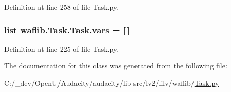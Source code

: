 Definition at line 258 of file Task.\+py.

\subsubsection[{\texorpdfstring{vars}{vars}}]{\setlength{\rightskip}{0pt plus 5cm}list waflib.\+Task.\+Task.\+vars = \mbox{[}$\,$\mbox{]}\hspace{0.3cm}{\ttfamily [static]}}\hypertarget{classwaflib_1_1_task_1_1_task_a3935d632055836871b233ce2deb9f008}{}\label{classwaflib_1_1_task_1_1_task_a3935d632055836871b233ce2deb9f008}


Definition at line 225 of file Task.\+py.



The documentation for this class was generated from the following file\+:\begin{DoxyCompactItemize}
\item 
C\+:/\+\_\+dev/\+Open\+U/\+Audacity/audacity/lib-\/src/lv2/lilv/waflib/\hyperlink{lilv_2waflib_2_task_8py}{Task.\+py}\end{DoxyCompactItemize}
